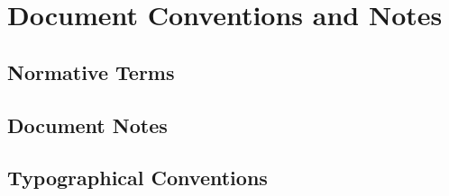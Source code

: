 \clearpage
\section{Document Conventions and Notes}

\subsection{Normative Terms}
\OTTNormativeTerms

\subsection{Document Notes}
\OTHTDocumentNotes

\subsection{Typographical Conventions}
\OTHTTypographicalConventions
